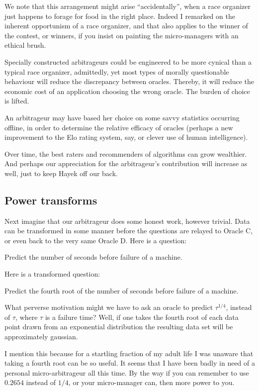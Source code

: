 We note that this arrangement might arise ``accidentally'', when a race organizer just happens to forage for food in the right place. Indeed I remarked on the inherent opportunism of a race organizer, and that also applies to the winner of the contest, or winners, if you insist on painting the micro-managers with an ethical brush. 


Specially constructed arbitrageurs could be engineered to be more cynical than a typical race organizer, admittedly, yet most types of morally questionable behaviour will reduce the discrepancy between oracles. Thereby, it will reduce the economic cost of an application choosing the wrong oracle. The burden of choice is lifted. 

An arbitrageur may have based her choice on some savvy statistics occurring offline, in order to determine the relative efficacy of oracles (perhaps a new improvement to the Elo rating system, say, or clever use of human intelligence).   

Over time, the best raters and recommenders of algorithms can grow wealthier. And perhaps our appreciation for the arbitrageur's contribution will increase as well, just to keep Hayek off our back.  

\subsection{Power transforms}

Next imagine that our arbitrageur does some honest work, however trivial. Data can be transformed in some manner before the questions are relayed to Oracle C, or even back to the very same Oracle D. Here is a question:
\begin{oldquote}
Predict the number of seconds before failure of a machine.
\end{oldquote}
Here is a transformed question:
\begin{oldquote}
Predict the fourth root of the number of seconds before failure of a machine.
\end{oldquote}
What perverse motivation might we have to ask an oracle to predict $\tau^{1/4}$, instead of $\tau$, where $\tau$ is a failure time? Well, if one takes the fourth root of each data point drawn from an exponential distribution the resulting data set will be approximately gaussian.

I mention this because for a startling fraction of my adult life I was unaware that taking a fourth root can be so useful. It seems that I have been badly in need of a personal micro-arbitrageur all this time. By the way if you can remember to use $0.2654$ instead of $1/4$, or your micro-manager can, then more power to you. 

